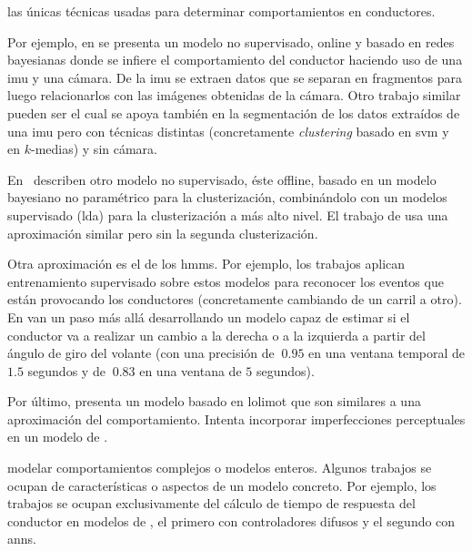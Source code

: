  las únicas técnicas usadas para determinar comportamientos en conductores.

Por ejemplo, en \cite{maye2011bayesian} se presenta un modelo no supervisado, online y basado en redes bayesianas donde se infiere el comportamiento del conductor haciendo uso de una \gls{imu} y una cámara. De la \gls{imu} se extraen datos que se separan en fragmentos para luego relacionarlos con las imágenes obtenidas de la cámara. Otro trabajo similar pueden ser \cite{van2013driver} el cual se apoya también en la segmentación de los datos extraídos de una \gls{imu} pero con técnicas distintas (concretamente \textit{clustering} basado en \gls{svm} y en $k$-medias) y sin cámara.

En~\cite{bando2013unsupervised} describen otro modelo no supervisado, éste offline, basado en un modelo bayesiano no paramétrico para la clusterización, combinándolo con un modelos supervisado (\gls{lda}) para la clusterización a más alto nivel. El trabajo de \cite{bender2015unsupervised} usa una aproximación similar pero sin la segunda clusterización.

Otra aproximación es el de los \glspl{hmm}. Por ejemplo, los trabajos \cite{Kuge2000,sekizawa2007modeling} aplican entrenamiento supervisado sobre estos modelos para reconocer los eventos que están provocando los conductores (concretamente cambiando de un carril a otro). En \cite{Hou2011} van un paso más allá desarrollando un modelo capaz de estimar si el conductor va a realizar un cambio a la derecha o a la izquierda a partir del ángulo de giro del volante (con una precisión de $~0.95$ en una ventana temporal de $1.5$ segundos y de $~0.83$ en una ventana de $5$ segundos).

Por último, \cite{Aghabayk2013} presenta un modelo basado en \gls{lolimot} que son similares a una aproximación \textit{} del comportamiento. Intenta incorporar imperfecciones perceptuales en un modelo de \textit{}.

 modelar comportamientos complejos o modelos enteros. Algunos trabajos se ocupan de características o aspectos de un modelo concreto. Por ejemplo, los trabajos \cite{Hatipkarasulu2002, zheng2013} se ocupan exclusivamente del cálculo de tiempo de respuesta del conductor en modelos de \textit{}, el primero con controladores difusos y el segundo con \glspl{ann}.
